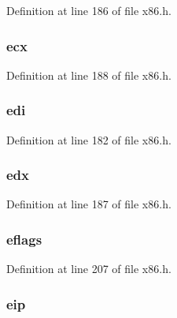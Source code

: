 Definition at line 186 of file x86.\-h.

\hypertarget{structtrapframe_ab36b3e14ca8cf65ad02ef0b466bff207}{
\subsubsection[{ecx}]{ ecx}}\label{structtrapframe_ab36b3e14ca8cf65ad02ef0b466bff207}


Definition at line 188 of file x86.\-h.

\hypertarget{structtrapframe_a5d017b35dd2b40671e27c7ae6c276b23}{
\subsubsection[{edi}]{ edi}}\label{structtrapframe_a5d017b35dd2b40671e27c7ae6c276b23}


Definition at line 182 of file x86.\-h.

\hypertarget{structtrapframe_a897b994c12c5e0174809a975642fe7fb}{
\subsubsection[{edx}]{ edx}}\label{structtrapframe_a897b994c12c5e0174809a975642fe7fb}


Definition at line 187 of file x86.\-h.

\hypertarget{structtrapframe_a96d2765012333ea2615dda6ac2521d61}{
\subsubsection[{eflags}]{ eflags}}\label{structtrapframe_a96d2765012333ea2615dda6ac2521d61}


Definition at line 207 of file x86.\-h.

\hypertarget{structtrapframe_ae590d07d633d3642402cd0b25e053568}{
\subsubsection[{eip}]{ eip}}\label{structtrapframe_ae590d07d633d3642402cd0b25e053568}


